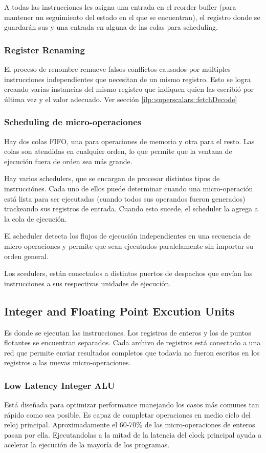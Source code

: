 A todas las instrucciones les asigna una entrada en el reorder buffer (para mantener un seguimiento del estado en el que se encuentran), el registro donde se guardarán sus y una entrada en alguna de las colas para scheduling.

\subsubsection*{Register Renaming}
El proceso de renombre remueve falsos conflictos causados por múltiples instrucciones independientes que necesitan de un mismo registro. Esto se logra creando varias instancias del mismo registro que indiquen quien las escribió por última vez y el valor adecuado. Ver sección \ref{ilp::superscalars::fetchDecode} 

\subsubsection*{Scheduling de micro-operaciones}
Hay dos colas FIFO, una para operaciones de memoria y otra para el resto. Las colas son atendidas en cualquier orden, lo que permite que la ventana de ejecución fuera de orden sea más grande.

Hay varios schedulers, que se encargan de procesar distintos tipos de instrucciónes. Cada uno de ellos puede determinar cuando una micro-operación está lista para ser ejecutadas (cuando todos sus operandos fueron generados) trackeando sus registros de entrada. Cuando esto sucede, el scheduler la agrega a la cola de ejecución.

El scheduler detecta los flujos de ejecución independientes en una secuencia de micro-operaciones y permite que sean ejecutados paralelamente sin importar su orden general.

Los scedulers, están conectados a distintos puertos de despachos que envían las instrucciones a sus respectivas unidades de ejecución.

\subsection{Integer and Floating Point Excution Units}
Es donde se ejecutan las instrucciones.
Los registros de enteros y los de puntos flotantes se encuentran separados. Cada archivo de registros está conectado a una red que permite enviar resultados completos que todavía no fueron escritos en los registros a las nuevas micro-operaciones.

\subsubsection*{Low Latency Integer ALU}
Está diseñada para optimizar performance manejando los casos más comunes tan rápido como sea posible. Es capaz de completar operaciones en medio ciclo del reloj principal. Aproximadamente el 60-70\% de las micro-operaciones de enteros pasan por ella. Ejecutandolas a la mitad de la latencia del clock principal ayuda a acelerar la ejecución de la mayoría de los programas.

